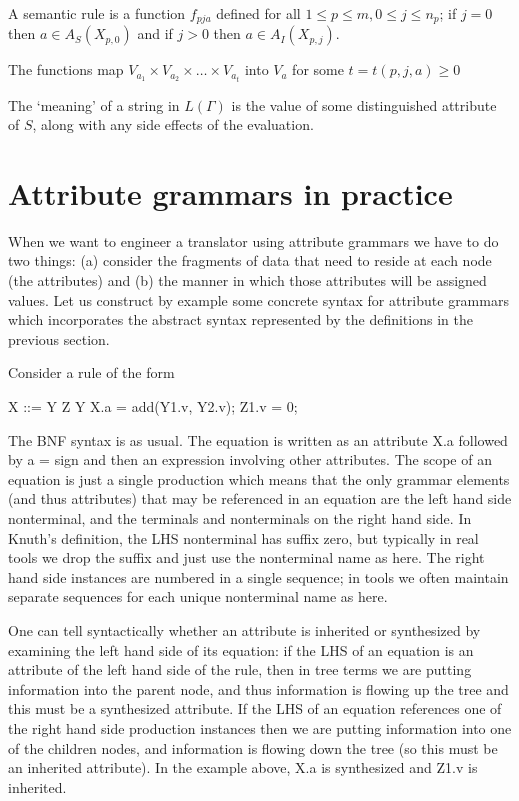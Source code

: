 A semantic rule is a function $f_{pja}$ defined for all $1 \le p \le m, 0 \le j \le n_p$; if $j=0$ then $a \in A_S(X_{p,0})$ and if $j>0$ then $ a \in A_I(X_{p,j})$.

The functions map $V_{a_1}\times V_{a_2} \times \ldots \times V_{a_t}$ into $V_a$ for some $t= t(p,j,a) \ge 0$

The `meaning' of a string in $L(\Gamma)$ is the value of some distinguished attribute of $S$, along with any side effects of the evaluation.

\section{Attribute grammars in practice}
When we want to engineer a translator using attribute grammars we have to do two things: (a) consider the fragments of data that need to reside at each node (the attributes) and (b) the manner in which those attributes will be assigned values. Let us construct by example some concrete syntax for attribute grammars which incorporates the abstract syntax represented by the definitions in the previous section.

Consider a rule of the form
\begin{bnfblock}
X ::= Y Z Y   { X.a = add(Y1.v, Y2.v);  Z1.v = 0; }
\end{bnfblock}

The BNF syntax is as usual. The equation is written as an attribute {\sf X.a} followed by a {\sf =} sign and then an expression involving other attributes. The scope of an equation is just a single production
which means that the only grammar elements (and thus attributes) that may be referenced in an equation are the left hand side nonterminal, and the terminals and nonterminals on the right hand side. In Knuth's definition, the LHS nonterminal has suffix zero, but typically in real tools we drop the suffix and just use the nonterminal name as here. The right hand side instances are numbered in a single sequence; in tools we often maintain separate sequences for each unique nonterminal name as here.

One can tell syntactically whether an attribute is inherited or synthesized by examining the left hand side of its equation: if the LHS of an equation is an attribute of the left hand side of the rule, then in tree terms we are putting information into the parent node, and thus information is flowing up the tree and this must be a synthesized attribute. If the LHS of an equation references one of the right hand side production instances then we are putting information into one of the children nodes, and information is flowing down the tree (so this must be an inherited attribute). In the example above, {\sf X.a} is synthesized and {\sf Z1.v} is inherited.

